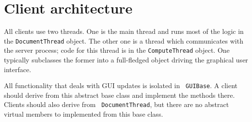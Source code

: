 
\section{Client architecture}

All clients use two threads. One is the main thread and runs most of
the logic in the {\tt DocumentThread} object. The other one is a
thread which communicates with the server process; code for this
thread is in the {\tt ComputeThread} object.  One typically subclasses
the former into a full-fledged object driving the graphical user
interface.

All functionality that deals with GUI updates is isolated in {\tt
  GUIBase}. A client should derive from this abstract base class and
implement the methods there. Clients should also derive from {\tt
  DocumentThread}, but there are no abstract virtual members to
implemented from this base class.
